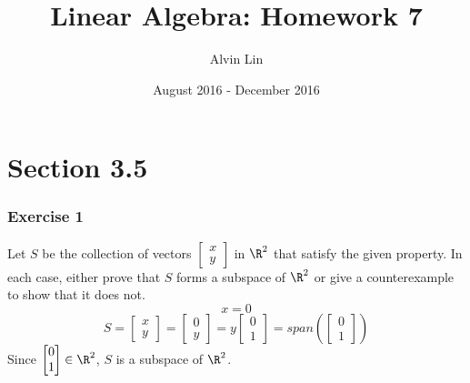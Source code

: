 \documentclass[letterpaper, 12pt]{math}
\title{Linear Algebra: Homework 7}
\author{Alvin Lin}
\date{August 2016 - December 2016}
\begin{document}
\maketitle

\section*{Section 3.5}

\subsubsection*{Exercise 1}
Let \( S \) be the collection of vectors \( \begin{bmatrix}x \\ y\end{bmatrix}
\) in \( \R^2 \) that satisfy the given property. In each case, either prove
that \( S \) forms a subspace of \( \R^2 \) or give a counterexample to show
that it does not.
\[ x = 0 \]
\[ S = \begin{bmatrix}x \\ y\end{bmatrix} =
  \begin{bmatrix}0 \\ y\end{bmatrix} =
  y\begin{bmatrix}0 \\ 1\end{bmatrix} =
  span\left(\begin{bmatrix}0 \\ 1\end{bmatrix}\right) \]
Since \( \begin{bmatrix}0 \\ 1\end{bmatrix}\in\R^2 \), \( S \) is a subspace
of \( \R^2 \).
\end{document}
